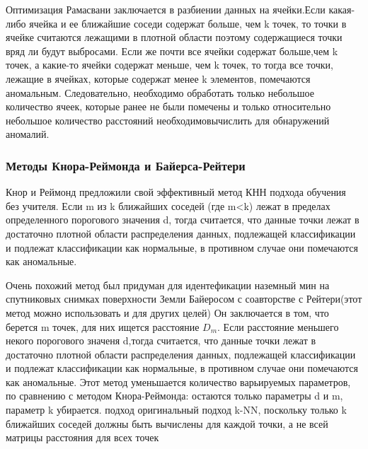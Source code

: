  Оптимизация Рамасвани заключается в разбиении данных на ячейки.Если какая-либо ячейка и ее ближайшие соседи содержат больше, чем k
 точек, то точки в ячейке считаются лежащими в плотной области
 поэтому содержащиеся точки вряд ли будут выбросами. Если же почти все ячейки содержат больше,чем k точек, а какие-то ячейки содержат меньше, чем k точек, то тогда все точки, лежащие в ячейках, которые содержат  менее k элементов, помечаются  аномальным. Следовательно,
 необходимо обработать только небольшое количество ячеек, которые ранее не были помечены и только относительно небольшое количество расстояний необходимовычислить для обнаружений аномалий. 
 
 \subsubsection{Методы Кнора-Реймонда и Байерса-Рейтери}
 Кнор и Реймонд предложили свой эффективный метод  КНН подхода обучения без учителя\cite{Book09}. Если m из k ближайших соседей (где m<k) лежат
 в пределах определенного порогового значения d, тогда  считается, что  данные точки лежат в достаточно плотной области распределения данных, подлежащей классификации и подлежат классификации как нормальные, в противном случае они помечаются как аномальные.
 
  Очень похожий метод был придуман для идентефикации  наземный мин  на спутниковых снимках поверхности Земли Байеросом с соавторстве с Рейтери\cite{Book10}(этот метод можно использовать и для других целей) Он заключается в том, что берется m точек, для них ищется расстояние $D_m$. Если расстояние меньшего некого порогового значеня d,тогда  считается, что  данные точки лежат в достаточно плотной области распределения данных, подлежащей классификации и подлежат классификации как нормальные, в противном случае они помечаются как аномальные. Этот метод уменьшается количество варьируемых параметров, по сравнению с методом Кнора-Реймонда: остаются только параметры d и m, параметр k убирается. 
  подход оригинальный подход k-NN, поскольку только k ближайших соседей должны быть вычислены для каждой точки, а не всей матрицы расстояния
  для всех точек
